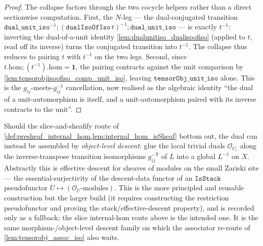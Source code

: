 \begin{proof}
  \leanok
  The collapse factors through the two cocycle helpers rather than a direct sectionwise computation.
  First, the \(N\)-leg --- the dual-conjugated transition
  \(\mathtt{dual\_unit\_iso}^{-1} \mathbin{;} (\mathtt{dualIsoOfIso}\,t)^{-1} \mathbin{;}
  \mathtt{dual\_unit\_iso}\) --- is exactly \(t^{-1}\): inverting the dual-of-a-unit identity
  \cref{lem:dualunitiso_dualisoofiso} (applied to \(t\), read off its inverse) turns the conjugated
  transition into \(t^{-1}\). The collapse thus reduces to pairing \(t\) with \(t^{-1}\) on the two
  legs. Second, since \(t.\mathrm{hom} \mathbin{;} (t^{-1}).\mathrm{hom} = \mathbf 1\), the pairing
  contracts against the unit comparison by \cref{lem:tensorobjisoofiso_comp_unit_iso}, leaving
  \(\mathtt{tensorObj\_unit\_iso}\) alone. This is the \(g_{ij}\)-meets-\(g_{ij}^{-1}\) cancellation,
  now realised as the algebraic identity ``the dual of a unit-automorphism is itself, and a
  unit-automorphism paired with its inverse contracts to the unit''.
\end{proof}

\begin{remark}
  \label{rem:dual_via_stack}
  Should the slice-and-sheafify route of
  \cref{def:presheaf_internal_hom,lem:internal_hom_isSheaf} bottom out, the dual can
  instead be assembled by \emph{object-level descent}: glue the local trivial duals
  \(\mathcal{O}_{U_i}\) along the inverse-transpose transition isomorphisms
  \(g_{ij}^{-\mathsf{T}}\) of \(L\) into a global \(L^{-1}\) on \(X\). Abstractly this
  is effective descent for sheaves of modules on the small Zariski site --- the
  essential-surjectivity of the descent-data functor of an \(\mathtt{IsStack}\)
  pseudofunctor \(U \mapsto (\mathcal{O}_U\text{-modules})\). This is the more
  principled and reusable construction but the larger build (it requires constructing
  the restriction pseudofunctor and proving the stack/effective-descent property),
  and is recorded only as a fallback; the slice internal-hom route above is the
  intended one. It is the same morphism-/object-level descent family on which the
  associator re-route of \cref{lem:tensorobj_assoc_iso} also waits.
\end{remark}

